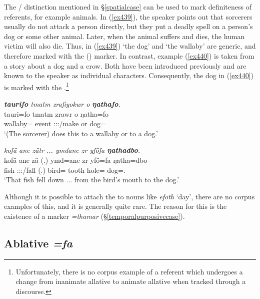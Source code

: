 The / distinction mentioned in {\S}\ref{spatialcase} can be used to mark definiteness of  referents, for example animals. In (\ref{ex439}), the speaker points out that sorcerers usually do not attack a person directly, but they put a deadly spell on a person's dog or some other animal. Later, when the animal suffers and dies, the human victim will also die. Thus, in (\ref{ex439}) `the dog' and `the wallaby' are generic, and therefore marked with the ()   marker. In contrast, example (\ref{ex440}) is taken from a story about a dog and a crow. Both have been introduced previously and are known to the speaker as individual characters. Consequently, the dog in (\ref{ex440}) is marked with the  .\footnote{Unfortunately, there is no corpus example of a referent which undergoes a change from inanimate allative to animate allative when tracked through a discourse.}

\begin{exe}
	\ex \emph{\textbf{taurifo} tmatm zrafiyokwr o \textbf{ŋathafo}.}\\
	\gll tauri=fo tmatm zrawr o ŋatha=fo\\
	wallaby={\All} event \Stsg:\Sbj:\Irr:\Ipfv/make or dog=\All\\
	\trans `(The sorcerer) does this to a wallaby or to a dog.'
	\label{ex439}
\end{exe}
\begin{exe}
	\ex \emph{kofä ane zätr ... ymdane zr yföfa \textbf{ŋathadbo}.}\\
	\gll kofä ane zä (.) ymd=ane zr yfö=fa ŋatha=dbo\\
	fish {\Dem} \Stsg:\Sbj:\Rpst:\Pfv/fall (.) bird={\Poss} tooth hole={\Abl} dog=\All.\Anim\\
	\trans `That fish fell down ... from the bird's mouth to the dog.'
	\label{ex440}
\end{exe}
	
Although it is possible to attach the  to  nouns like \emph{efoth} `day', there are no corpus examples of this, and it is generally quite rare. The reason for this is the existence of a    marker \emph{=thamar} ({\S}\ref{temporalpurposivecase}).

\subsection{Ablative \emph{=fa}} \label{ablativecase}

